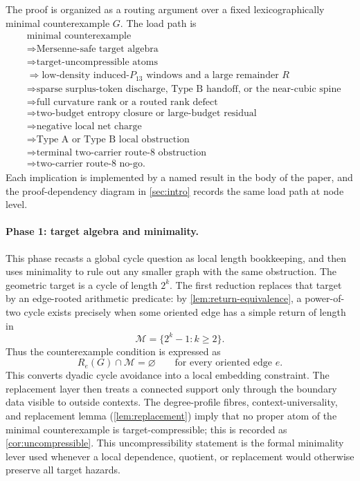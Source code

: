 \documentclass[11pt]{article}
\newcommand{\Mers}{\mathcal M}
\begin{document}
The proof is organized as a routing argument over a fixed lexicographically minimal
counterexample $G$.  The load path is
\[
\begin{aligned}
&\text{minimal counterexample}\\
&\Rightarrow \text{Mersenne-safe target algebra}\\
&\Rightarrow \text{target-uncompressible atoms}\\
&\Rightarrow \text{low-density induced-}P_{13}\text{ windows and a large remainder }R\\
&\Rightarrow \text{sparse surplus-token discharge, Type B handoff, or the near-cubic spine}\\
&\Rightarrow \text{full curvature rank or a routed rank defect}\\
&\Rightarrow \text{two-budget entropy closure or large-budget residual}\\
&\Rightarrow \text{negative local net charge}\\
&\Rightarrow \text{Type A or Type B local obstruction}\\
&\Rightarrow \text{terminal two-carrier route-8 obstruction}\\
&\Rightarrow \text{two-carrier route-8 no-go.}
\end{aligned}
\]
Each implication is implemented by a named result in the body of the paper, and
the proof-dependency diagram in \cref{sec:intro} records the same load path at
node level.

\paragraph{Phase 1: target algebra and minimality.}
This phase recasts a global cycle question as local length bookkeeping, and
then uses minimality to rule out any smaller graph with the same obstruction.
The geometric target is a cycle of length $2^k$.  The first reduction replaces
that target by an edge-rooted arithmetic predicate: by
\cref{lem:return-equivalence}, a power-of-two cycle exists precisely when some
oriented edge has a simple return of length in
\[
\Mers=\{2^k-1:k\ge2\}.
\]
Thus the counterexample condition is expressed as
\[
R_e(G)\cap \Mers=\varnothing
\qquad\text{for every oriented edge }e .
\]
This converts dyadic cycle avoidance into a local embedding constraint.  The
replacement layer then treats a connected support only through the boundary
data visible to outside contexts.  The degree-profile fibres,
context-universality, and replacement lemma
(\cref{lem:replacement}) imply that no proper atom of the minimal
counterexample is target-compressible; this is recorded as
\cref{cor:uncompressible}.  This uncompressibility statement is the formal
minimality lever used whenever a local dependence, quotient, or replacement
would otherwise preserve all target hazards.
\end{document}
